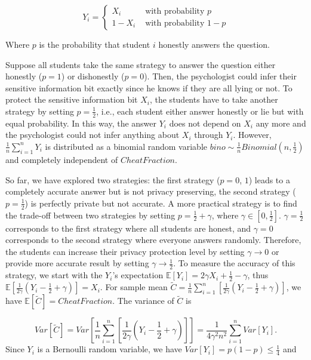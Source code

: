 \begin{equation}
    Y_{i}=
    \begin{cases}X_{i}   & \text { with probability } p   \\
             1-X_{i} & \text { with probability } 1-p
    \end{cases}
\end{equation}

Where $p$ is the probability that student $i$ honestly answers the question.

Suppose all students take the same strategy to answer the question either honestly ($p=1$) or dishonestly ($p=0$). Then, the psychologist could infer their sensitive information bit exactly since he knows if they are all lying or not. To protect the sensitive information bit $X_{i}$, the students have to take another strategy by setting $p=\frac{1}{2}$, i.e., each student either answer honestly or lie but with equal probability. In this way, the answer $Y_{i}$ does not depend on $X_{i}$ any more and the psychologist could not infer anything about $X_{i}$ through $Y_{i}$. However, $\frac{1}{n}\sum ^{n}_{i=1}Y_{i}$  is distributed as a binomial random variable $bino \sim \frac{1}{n} Binomial\left(n,\frac{1}{2}\right)$ and completely independent of $CheatFraction$.

So far, we have explored two strategies: the first strategy ($p=0$, $1$) leads to a completely accurate answer but is not privacy preserving, the second strategy ($p=\frac{1}{2}$) is perfectly private but not accurate. A more practical strategy is to find the trade-off between two strategies by setting $p=\frac{1}{2}+\gamma$, where $\gamma \in \left[ 0 ,\frac{1}{2}\right] $. $\gamma=\frac{1}{2}$ corresponds to the first strategy where all students are honest, and $\gamma=0$ corresponds to the second strategy where everyone answers randomly. Therefore, the students can increase their privacy protection level by setting $\gamma \to 0$ or provide more accurate result by setting $\gamma \to \frac{1}{2}$.
To measure the accuracy of this strategy, we start with the $Y_{i}$’s expectation $\mathbb{E}\left[ Y_{i}\right] =2\gamma X_{i}+\frac{1}{2}-\gamma$, thus $\mathbb{E} \left[ \frac{1}{2\gamma } \left(Y_{i}-\frac{1}{2}+\gamma \right) \right] =X_{i}$. For sample mean $\tilde{C}=\frac{1}{n}\sum ^{n}_{i=1}\left[ \frac{1}{2\gamma}\left( Y_{i}-\frac{1}{2}+\gamma \right) \right] $, we have $\mathbb{E}\left[ \tilde{C}\right] =CheatFraction$. The variance of $\tilde{C}$ is

\begin{equation}
    Var\left[ \tilde{C}\right] =Var\left[\frac{1}{n}\sum ^{n}_{i= 1}\left[ \frac{1}{2\gamma }\left( Y_{i}-\frac{1}{2}+\gamma \right) \right]\right] =\frac{1}{4\gamma^{2}n^{2}}\sum ^{n}_{i=1}Var\left[ Y_{i}\right].
\end{equation}
Since $Y_{i}$ is a Bernoulli random variable, we have $Var\left[Y_i\right] =p\left(1-p\right)\leq\frac{1}{4} $ and

